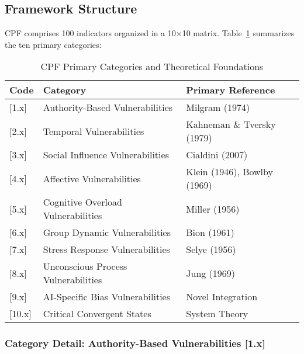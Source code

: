 \documentclass[11pt,a4paper]{article}
\begin{document}
\subsection{Framework Structure}

CPF comprises 100 indicators organized in a 10×10 matrix. Table~\ref{tab:categories} summarizes the ten primary categories:

\begin{table}[h!]
\centering
\caption{CPF Primary Categories and Theoretical Foundations}
\label{tab:categories}
\begin{tabular}{lll}
\toprule
Code & Category & Primary Reference \\
\midrule
{[}1.x{]} & Authority-Based Vulnerabilities & Milgram (1974) \\
{[}2.x{]} & Temporal Vulnerabilities & Kahneman \& Tversky (1979) \\
{[}3.x{]} & Social Influence Vulnerabilities & Cialdini (2007) \\
{[}4.x{]} & Affective Vulnerabilities & Klein (1946), Bowlby (1969) \\
{[}5.x{]} & Cognitive Overload Vulnerabilities & Miller (1956) \\
{[}6.x{]} & Group Dynamic Vulnerabilities & Bion (1961) \\
{[}7.x{]} & Stress Response Vulnerabilities & Selye (1956) \\
{[}8.x{]} & Unconscious Process Vulnerabilities & Jung (1969) \\
{[}9.x{]} & AI-Specific Bias Vulnerabilities & Novel Integration \\
{[}10.x{]} & Critical Convergent States & System Theory \\
\bottomrule
\end{tabular}
\end{table}

\FloatBarrier  %

\subsubsection{Category Detail: Authority-Based Vulnerabilities [1.x]}
\end{document}
